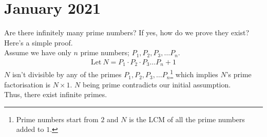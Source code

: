\section{January 2021}
    {}
\thispagestyle{empty}
\newpage
\begin{mathbox}{}
{Are there infinitely many prime numbers? If yes, how do we prove they exist?\\
Here's a simple proof.\\
{Assume} we have only $n$ prime numbers; $P_1, P_2, P_3, \dots P_n$.
\begin{align*}
\text{Let}~N = P_1 \cdot P_2 \cdot P_3 \dots P_n + 1
\end{align*}
$N$ {isn't divisible} by any of the primes $P_1, P_2, P_3, \dots P_n$\footnote{Prime numbers start from $2$ and $N$ is the LCM of all the prime numbers added to $1$.}  which implies $N$'s {prime factorisation} is $N \times 1$. $N$ being prime {contradicts} our initial assumption.\\
Thus, there exist infinite primes.}
\end{mathbox}
